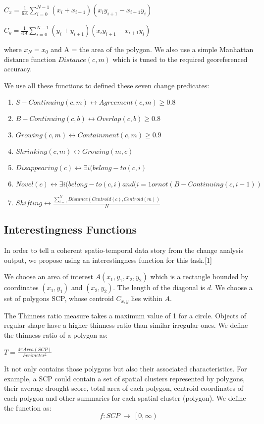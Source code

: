 \documentclass[conference]{IEEEtran}
\begin{document}
$C_x =\frac{1}{6A} \sum_{i=0}^{N-1}(x_i+x_{i+1})(x_iy_{i+1}-x_{i+1}y_i)$

$C_y =\frac{1}{6A} \sum_{i=0}^{N-1}(y_i+y_{i+1})(x_iy_{i+1}-x_{i+1}y_i)$

where $x_N=x_0$ and A = the area of the polygon. We also use a simple Manhattan distance function $Distance(c, m)$ which is tuned to the required georeferenced accuracy.

We use all these functions to defined these seven change predicates:

\begin{enumerate}
	\item $S-Continuing (c,m)  \leftrightarrow  Agreement (c,m) \geq 0.8$
	\item $B-Continuing(c,b)  \leftrightarrow  Overlap (c,b) \geq 0.8$
	\item $Growing(c,m)  \leftrightarrow  Containment (c,m) \geq 0.9 $
	\item $Shrinking(c,m) \leftrightarrow Growing (m,c)$
	\item $Disappearing(c) \leftrightarrow \exists i (belong-to(c,i) $
	\item $Novel (c) \leftrightarrow  \exists i (belong-to(c,i) and (i=1 or not(B-Continuing(c,i-1)) $
	\item $Shifting \leftrightarrow \frac{\sum_{i=1}^{N}Distance (Centroid(c), Centroid(m))}{N}$
\end{enumerate}

\subsection{Interestingness Functions}

In order to tell a coherent spatio-temporal data story from the change analysis output, we propose using an interestingness function for this task.[1]

We choose an area of interest $A(x_1,y_1,x_2,y_2)$ which is a rectangle bounded by  coordinates $(x_1, y_1)$ and $(x_2, y_2)$. The length of the diagonal is $d$. We choose a set of polygons SCP, whose centroid $C_{x,y}$ lies within $A$.

The Thinness ratio measure takes a maximum value of 1 for a circle. Objects of regular shape have a higher thinness ratio than similar irregular ones. We define the thinness ratio of a polygon as:

$T = \frac{4\pi Area(SCP) }{Perimeter^2}$ 



It not only contains those polygons but also their associated characteristics. For example, a SCP could contain a set of spatial clusters represented by polygons, their average drought score, total area of each polygon, centroid coordinates of each polygon and other summaries for each spatial cluster (polygon). We define the function as:
\[f:SCP\ \rightarrow\ \left[0\right.,\left.\infty\right)\]
\end{document}
